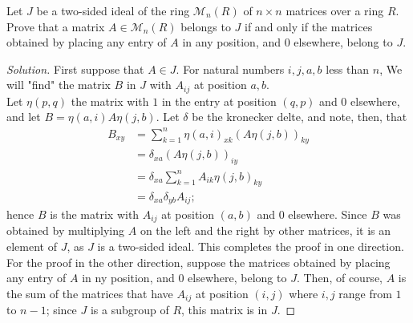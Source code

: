 \documentclass[12pt]{article}
\newenvironment{problem}[2][Problem]{\begin{trivlist}
\item[\hskip \labelsep {\bfseries #1}\hskip \labelsep {\bfseries #2.}]}{\end{trivlist}}
\newenvironment{solution}
  {\renewcommand\qedsymbol{$\blacksquare$}\begin{proof}[Solution]}
{\end{proof}}
\theoremstyle{remark}
\begin{document}
\begin{problem}{3.5}
  Let $J$ be a two-sided ideal of the ring $\mathcal{M}_n(R)$ of $n\times n$ matrices over a ring $R$.
  Prove that a matrix $A\in \mathcal{M}_n(R)$ belongs to $J$ if and only if the matrices obtained by 
  placing any entry of $A$ in any position, and 0 elsewhere, belong to $J$.
\end{problem}
\begin{solution}
  First suppose that $A\in J$. 
  For natural numbers $i,j,a,b$ less than $n$, We will "find" the matrix $B$ in $J$
  with $A_{ij}$ at position $a,b$. \\
  \indent Let $\eta(p,q)$ the matrix with $1$ in the entry at position $(q,p)$ and $0$ 
  elsewhere, and let $B=\eta(a,i)A\eta(j,b)$.
  Let $\delta$ be the kronecker delte, and note, then, that
    \begin{align*}
      B_{xy} &= \sum_{k=1}^{n} \eta(a,i)_{xk}(A\eta(j,b))_{ky}\\
      &= \delta_{xa} (A\eta(j,b))_{iy} \\
      &= \delta_{xa} \sum_{k=1}^n A_{ik}\eta(j,b)_{ky}\\ 
      &= \delta_{xa} \delta_{yb} A_{ij};
    \end{align*}
  hence $B$ is the matrix with $A_{ij}$ at position $(a,b)$ and $0$ elsewhere. 
  Since $B$ was obtained by multiplying $A$ on the left and the right by other matrices, 
  it is an element of $J$, as $J$ is a two-sided ideal.
  This completes the proof in one direction. \\
  \indent For the proof in the other direction, suppose the matrices obtained by placing any
  entry of $A$ in ny position, and 0 elsewhere, belong to $J$.
  Then, of course, $A$ is the sum of the matrices that have $A_{ij}$ at position $(i,j)$ where
  $i,j$ range from $1$ to $n-1$; since $J$ is a subgroup of $R$, this matrix is in $J$.
\end{solution}
\end{document}
